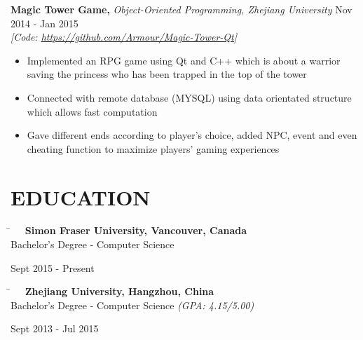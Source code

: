 \documentclass[11pt]{article} %
\begin{document}
\hspace{6mm}\textbf{Magic Tower Game,} \textit{Object-Oriented Programming, Zhejiang University} \hfill Nov 2014 - Jan 2015\\
\vspace{1mm}
\hspace{6mm}\textit{[Code: \underline{\href{https://github.com/Armour/Magic-Tower-Qt}{https://github.com/Armour/Magic-Tower-Qt}}]}
\begin{itemize}[leftmargin=16mm]
        \item Implemented an RPG game using Qt and C++ which is about a warrior saving the princess who has been trapped in the top of the tower
		\vspace{-2mm}
        \item Connected with remote database (MYSQL) using data orientated structure which allows fast computation
		\vspace{-2mm}
        \item Gave different ends according to player's choice, added NPC, event and even cheating function to maximize players' gaming experiences
\end{itemize}


\section{EDUCATION}

\vspace{-3mm}
\parbox{0.5\textwidth}{
\begin{tabbing}
\hspace{4mm} \= \kill
\>\textbf{\ \ Simon Fraser University, Vancouver, Canada}\\[2mm]
\hspace{13mm} Bachelor's Degree - Computer Science
\end{tabbing}
}
\hfill
\parbox{0.5\textwidth}{
\begin{tabbing}
Sept 2015 - Present\\[2mm]
\end{tabbing}
}

\vspace{-5mm}
\parbox{0.5\textwidth}{
\begin{tabbing}
\hspace{4mm} \= \kill
\>\textbf{\ \ Zhejiang University, Hangzhou, China}\\[2mm]
\hspace{13mm} Bachelor's Degree - Computer Science  \textit{(GPA: 4.15/5.00)}
\end{tabbing}
}
\hfill
\parbox{0.5\textwidth}{
\begin{tabbing}
Sept 2013 - Jul 2015\\[2mm]
\end{tabbing}
}
\end{document}
